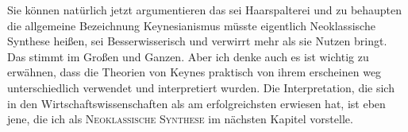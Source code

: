Sie können natürlich jetzt argumentieren das sei Haarspalterei und zu behaupten die allgemeine Bezeichnung Keynesianismus müsste eigentlich Neoklassische Synthese heißen, sei Besserwisserisch und verwirrt mehr als sie Nutzen bringt. Das stimmt im Großen und Ganzen. Aber ich denke auch es ist wichtig zu erwähnen, dass die Theorien von Keynes praktisch von ihrem erscheinen weg unterschiedlich verwendet und interpretiert wurden. Die Interpretation, die sich in den Wirtschaftswissenschaften als am erfolgreichsten erwiesen hat, ist eben jene, die ich als \textsc{Neoklassische Synthese} im nächsten Kapitel vorstelle. 



